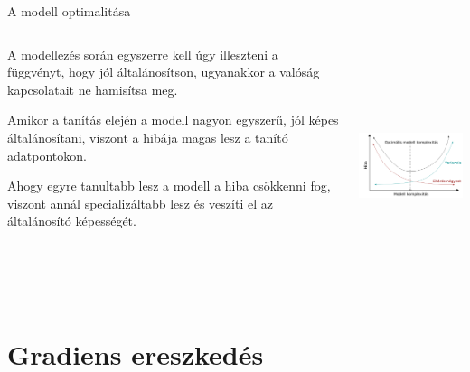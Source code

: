 \documentclass[english, aspectratio=169]{beamer}
\makeatletter
\let\origtableofcontents=\tableofcontents
\def\tableofcontents{\@ifnextchar[{\origtableofcontents}{\gobbletableofcontents}}
\def\gobbletableofcontents#1{\origtableofcontents}
\makeatother
\begin{document}
\begin{frame}{A modell optimalitása}
\begin{columns}
\begin{column}{.5\textwidth}
A modellezés során egyszerre kell úgy illeszteni a függvényt, hogy jól általánosítson, ugyanakkor a valóság kapcsolatait ne hamisítsa meg.\par\medskip
Amikor a tanítás elején a modell nagyon egyszerű, jól képes általánosítani, viszont a hibája magas lesz a tanító adatpontokon.\par\medskip
Ahogy egyre tanultabb lesz a modell a hiba csökkenni fog, viszont annál specializáltabb lesz és veszíti el az általánosító képességét. 
\end{column}
\begin{column}{.5\textwidth}
\begin{center}
\includegraphics[width=7cm, height=7cm, keepaspectratio]{images/regresszio_16.png}
\end{center}
\end{column}
\end{columns}
\end{frame}

\section{Gradiens ereszkedés}

\begin{frame}
\tableofcontents[currentsection]
\end{frame}
\end{document}
